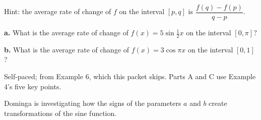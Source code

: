 {\small Hint: the average rate of change of $f$ on the interval $[p,q]$ is $\dfrac{f(q)-f(p)}{q-p}$.}

\begin{minipage}[t]{0.48\textwidth}
\textbf{a.} What is the average rate of change of $f(x)=5\sin\frac12 x$ on the interval $[0,\pi]$?\lines[2]
\end{minipage}\hfill
\begin{minipage}[t]{0.48\textwidth}
\textbf{b.} What is the average rate of change of $f(x)=3\cos\pi x$ on the interval $[0,1]$?\lines[2]
\end{minipage}

{\small Self-paced; from Example 6, which this packet skips. Parts A and C use Example 4's five key points.}

Dominga is investigating how the signs of the parameters $a$ and $b$ create transformations of the sine function.

